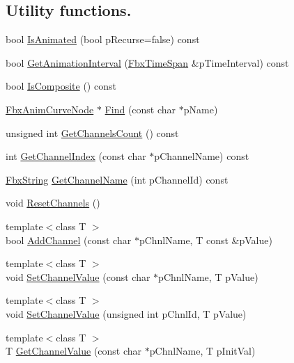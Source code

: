 \subsection*{Utility functions.}
\begin{DoxyCompactItemize}
\item 
bool \hyperlink{class_fbx_anim_curve_node_ad9ca0ff8cf30e3b55c91184be5f693ac}{Is\+Animated} (bool p\+Recurse=false) const
\item 
bool \hyperlink{class_fbx_anim_curve_node_a8bdce1ee829fd11bbd74ea2596f3977d}{Get\+Animation\+Interval} (\hyperlink{class_fbx_time_span}{Fbx\+Time\+Span} \&p\+Time\+Interval) const
\item 
bool \hyperlink{class_fbx_anim_curve_node_ad0fd9df109fb4e9c8702d37f03b6cc03}{Is\+Composite} () const
\item 
\hyperlink{class_fbx_anim_curve_node}{Fbx\+Anim\+Curve\+Node} $\ast$ \hyperlink{class_fbx_anim_curve_node_aca6ee712b7eeafb1d00f42117520bac4}{Find} (const char $\ast$p\+Name)
\item 
unsigned int \hyperlink{class_fbx_anim_curve_node_a17a3e0fdd0cb807c3fe37f07c9bef844}{Get\+Channels\+Count} () const
\item 
int \hyperlink{class_fbx_anim_curve_node_a8ba8427aa3f99361aaf23cee44439015}{Get\+Channel\+Index} (const char $\ast$p\+Channel\+Name) const
\item 
\hyperlink{class_fbx_string}{Fbx\+String} \hyperlink{class_fbx_anim_curve_node_a1ad770dcc06ec0638103935e4dfede3c}{Get\+Channel\+Name} (int p\+Channel\+Id) const
\item 
void \hyperlink{class_fbx_anim_curve_node_ad334950a15167317fbbc029fe806976d}{Reset\+Channels} ()
\item 
{\footnotesize template$<$class T $>$ }\\bool \hyperlink{class_fbx_anim_curve_node_a985772edb8c85825adfef69c6bd06627}{Add\+Channel} (const char $\ast$p\+Chnl\+Name, T const \&p\+Value)
\item 
{\footnotesize template$<$class T $>$ }\\void \hyperlink{class_fbx_anim_curve_node_a0efefd96f733f636d7aa95148be08726}{Set\+Channel\+Value} (const char $\ast$p\+Chnl\+Name, T p\+Value)
\item 
{\footnotesize template$<$class T $>$ }\\void \hyperlink{class_fbx_anim_curve_node_aceef8634351d11d9058b5d023de5f5b4}{Set\+Channel\+Value} (unsigned int p\+Chnl\+Id, T p\+Value)
\item 
{\footnotesize template$<$class T $>$ }\\T \hyperlink{class_fbx_anim_curve_node_ab9d76b0fea168dfe928ec2385e43c716}{Get\+Channel\+Value} (const char $\ast$p\+Chnl\+Name, T p\+Init\+Val)

\end{DoxyCompactItemize}
